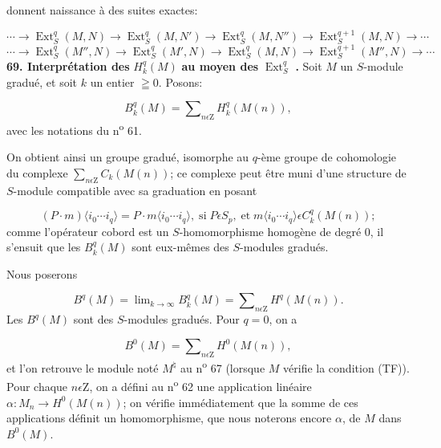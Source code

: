 
 donnent naissance à des suites exactes:

\begin{equation*}
\cdots \to \operatorname{Ext}_S^q(M, N) \to \operatorname{Ext}_S^q(M, N') \to \operatorname{Ext}_S^q(M, N'') \to \operatorname{Ext}_S^{q+1}(M, N) \to \cdots
\end{equation*}
\begin{equation*}
\cdots \to \operatorname{Ext}_S^q(M'', N) \to \operatorname{Ext}_S^q(M', N) \to \operatorname{Ext}_S^q(M, N) \to \operatorname{Ext}_S^{q+1}(M'', N) \to \cdots
\end{equation*}
\textbf{69. Interprétation des} $H_k^q(M)$ \textbf{au moyen des} $\operatorname{Ext}_S^q$ \textbf{.} Soit $M$ un $S$-module gradué, et soit $k$ un entier $\geqq 0$. Posons:

\begin{equation*}
B_k^q(M) = \sum\nolimits_{n \epsilon \mathrm{Z}} H_k^q(M(n)),
\end{equation*}
avec les notations du n\textsuperscript{o} 61.

On obtient ainsi un groupe gradué, isomorphe au $q$-ème groupe de cohomologie du complexe $\sum\nolimits_{n \epsilon \mathrm{Z}} C_k(M(n))$; ce complexe peut être muni d'une structure de $S$-module compatible avec sa graduation en posant

\begin{equation*}
(P \cdot m)\langle i_0 \cdots i_q \rangle = P \cdot m \langle i_0 \cdots i_q \rangle, \; \mathrm{si} \; P \epsilon S_p , \; \mathrm{et} \; m \langle i_0 \cdots i_q \rangle \epsilon C_k^q(M(n));
\end{equation*}
comme l'opérateur cobord est un $S$-homomorphisme homogène de degré 0, il s'ensuit que les $B_k^q(M)$ sont eux-mêmes des $S$-modules gradués.

Nous poserons

\begin{equation*}
B^q(M) = \lim\nolimits_{k \to \infty} B_k^q(M) = \sum\nolimits_{n \epsilon \mathrm{Z}} H^q(M(n)).
\end{equation*}
Les $B^q(M)$ sont des $S$-modules gradués. Pour $q = 0$, on a

\begin{equation*}
B^0(M) = \sum\nolimits_{n \epsilon \mathrm{Z}} H^0(M(n)),
\end{equation*}
et l'on retrouve le module noté $M^\natural$ au n\textsuperscript{o} 67 (lorsque $M$ vérifie la condition (TF)). Pour chaque $n \epsilon \mathrm{Z}$, on a défini au n\textsuperscript{o} 62 une application linéaire $\alpha:M_n \to H^0(M(n))$; on vérifie immédiatement que la somme de ces applications définit un homomorphisme, que nous noterons encore $\alpha$, de $M$ dans $B^0(M)$.

